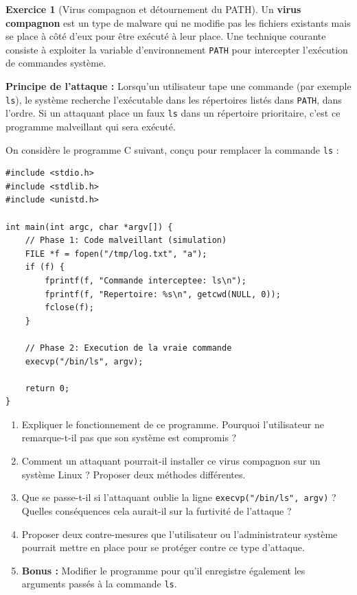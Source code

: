 \documentclass[a4paper,11pt]{article}
\theoremstyle{plain}
\theoremstyle{definition}
\newtheorem{exercice}{Exercice}
\begin{document}
\begin{exercice}[Virus compagnon et détournement du PATH]

Un \textbf{virus compagnon} est un type de malware qui ne modifie pas les fichiers existants mais se place à côté d'eux pour être exécuté à leur place. Une technique courante consiste à exploiter la variable d'environnement \texttt{PATH} pour intercepter l'exécution de commandes système.

\textbf{Principe de l'attaque :} Lorsqu'un utilisateur tape une commande (par exemple \texttt{ls}), le système recherche l'exécutable dans les répertoires listés dans \texttt{PATH}, dans l'ordre. Si un attaquant place un faux \texttt{ls} dans un répertoire prioritaire, c'est ce programme malveillant qui sera exécuté.

On considère le programme C suivant, conçu pour remplacer la commande \texttt{ls} :

\begin{verbatim}
#include <stdio.h>
#include <stdlib.h>
#include <unistd.h>

int main(int argc, char *argv[]) {
    // Phase 1: Code malveillant (simulation)
    FILE *f = fopen("/tmp/log.txt", "a");
    if (f) {
        fprintf(f, "Commande interceptee: ls\n");
        fprintf(f, "Repertoire: %s\n", getcwd(NULL, 0));
        fclose(f);
    }

    // Phase 2: Execution de la vraie commande
    execvp("/bin/ls", argv);

    return 0;
}
\end{verbatim}

\begin{enumerate}
\item Expliquer le fonctionnement de ce programme. Pourquoi l'utilisateur ne remarque-t-il pas que son système est compromis ?

\item Comment un attaquant pourrait-il installer ce virus compagnon sur un système Linux ? Proposer deux méthodes différentes.

\item Que se passe-t-il si l'attaquant oublie la ligne \texttt{execvp("/bin/ls", argv)} ? Quelles conséquences cela aurait-il sur la furtivité de l'attaque ?

\item Proposer deux contre-mesures que l'utilisateur ou l'administrateur système pourrait mettre en place pour se protéger contre ce type d'attaque.

\item \textbf{Bonus :} Modifier le programme pour qu'il enregistre également les arguments passés à la commande \texttt{ls}.
\end{enumerate}

\end{exercice}
\end{document}
